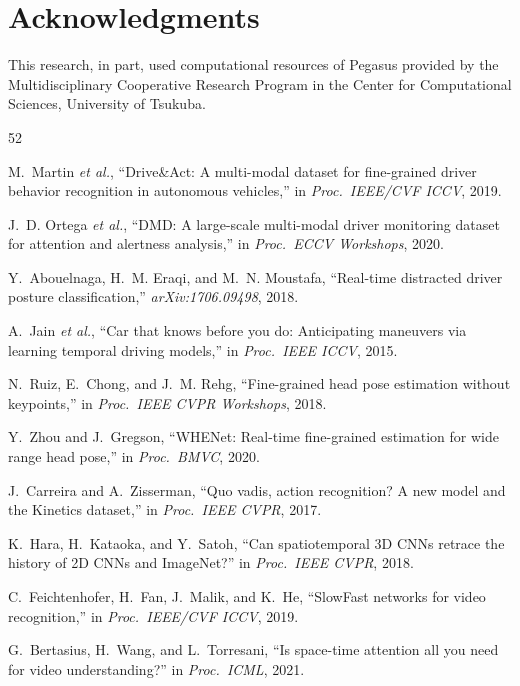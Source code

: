 \documentclass[journal]{IEEEtran}
\begin{document}
\section*{Acknowledgments}
This research, in part, used computational resources of Pegasus provided by
the Multidisciplinary Cooperative Research Program in the Center for
Computational Sciences, University of Tsukuba.

\begin{thebibliography}{52}

 M.~Martin \emph{et al.}, ``Drive\&Act: A
multi-modal dataset for fine-grained driver behavior recognition in
autonomous vehicles,'' in \emph{Proc.\ IEEE/CVF ICCV}, 2019.

 J.~D. Ortega \emph{et al.}, ``DMD: A large-scale
multi-modal driver monitoring dataset for attention and alertness
analysis,'' in \emph{Proc.\ ECCV Workshops}, 2020.

 Y.~Abouelnaga, H.~M. Eraqi, and
M.~N. Moustafa, ``Real-time distracted driver posture classification,''
\emph{arXiv:1706.09498}, 2018.

 A.~Jain \emph{et al.}, ``Car that knows before
you do: Anticipating maneuvers via learning temporal driving models,'' in
\emph{Proc.\ IEEE ICCV}, 2015.

 N.~Ruiz, E.~Chong, and J.~M. Rehg, ``Fine-grained
head pose estimation without keypoints,'' in \emph{Proc.\ IEEE CVPR
Workshops}, 2018.

 Y.~Zhou and J.~Gregson, ``WHENet: Real-time
fine-grained estimation for wide range head pose,'' in \emph{Proc.\ BMVC},
2020.

 J.~Carreira and A.~Zisserman, ``Quo vadis, action
recognition? A new model and the Kinetics dataset,'' in \emph{Proc.\ IEEE
CVPR}, 2017.

 K.~Hara, H.~Kataoka, and Y.~Satoh, ``Can
spatiotemporal 3D CNNs retrace the history of 2D CNNs and ImageNet?'' in
\emph{Proc.\ IEEE CVPR}, 2018.

 C.~Feichtenhofer, H.~Fan, J.~Malik, and
K.~He, ``SlowFast networks for video recognition,'' in \emph{Proc.\
IEEE/CVF ICCV}, 2019.

 G.~Bertasius, H.~Wang, and L.~Torresani,
``Is space-time attention all you need for video understanding?'' in
\emph{Proc.\ ICML}, 2021.


\end{thebibliography}
\end{document}
